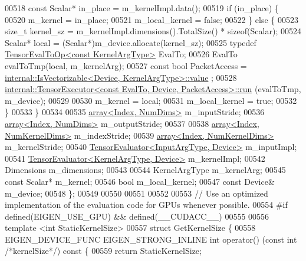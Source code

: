\begin{DoxyCode}
00518     \textcolor{keyword}{const} Scalar* in\_place = m\_kernelImpl.data();
00519     \textcolor{keywordflow}{if} (in\_place) \{
00520       m\_kernel = in\_place;
00521       m\_local\_kernel = \textcolor{keyword}{false};
00522     \} \textcolor{keywordflow}{else} \{
00523       \textcolor{keywordtype}{size\_t} kernel\_sz = m\_kernelImpl.dimensions().TotalSize() * \textcolor{keyword}{sizeof}(Scalar);
00524       Scalar* local = (Scalar*)m\_device.allocate(kernel\_sz);
00525       \textcolor{keyword}{typedef} \hyperlink{class_eigen_1_1_tensor_eval_to_op}{TensorEvalToOp<const KernelArgType>} EvalTo;
00526       EvalTo evalToTmp(local, m\_kernelArg);
00527       \textcolor{keyword}{const} \textcolor{keywordtype}{bool} PacketAccess = 
      \hyperlink{struct_eigen_1_1internal_1_1_is_vectorizable}{internal::IsVectorizable<Device, KernelArgType>::value}
      ;
00528       \hyperlink{class_eigen_1_1internal_1_1_tensor_executor}{internal::TensorExecutor<const EvalTo, Device, PacketAccess>::run}
      (evalToTmp, m\_device);
00529 
00530       m\_kernel = local;
00531       m\_local\_kernel = \textcolor{keyword}{true};
00532     \}
00533   \}
00534 
00535   \hyperlink{class_eigen_1_1array}{array<Index, NumDims>} m\_inputStride;
00536   \hyperlink{class_eigen_1_1array}{array<Index, NumDims>} m\_outputStride;
00537 
00538   \hyperlink{class_eigen_1_1array}{array<Index, NumKernelDims>} m\_indexStride;
00539   \hyperlink{class_eigen_1_1array}{array<Index, NumKernelDims>} m\_kernelStride;
00540   \hyperlink{struct_eigen_1_1_tensor_evaluator}{TensorEvaluator<InputArgType, Device>} m\_inputImpl;
00541   \hyperlink{struct_eigen_1_1_tensor_evaluator}{TensorEvaluator<KernelArgType, Device>} m\_kernelImpl;
00542   Dimensions m\_dimensions;
00543 
00544   KernelArgType m\_kernelArg;
00545   \textcolor{keyword}{const} Scalar* m\_kernel;
00546   \textcolor{keywordtype}{bool} m\_local\_kernel;
00547   \textcolor{keyword}{const} Device& m\_device;
00548 \};
00549 
00550 
00551 
00552 
00553 \textcolor{comment}{// Use an optimized implementation of the evaluation code for GPUs whenever possible.}
00554 \textcolor{preprocessor}{#if defined(EIGEN\_USE\_GPU) && defined(\_\_CUDACC\_\_)}
00555 
00556 \textcolor{keyword}{template} <\textcolor{keywordtype}{int} StaticKernelSize>
00557 \textcolor{keyword}{struct }GetKernelSize \{
00558   EIGEN\_DEVICE\_FUNC EIGEN\_STRONG\_INLINE \textcolor{keywordtype}{int} operator() (\textcolor{keyword}{const} \textcolor{keywordtype}{int} \textcolor{comment}{/*kernelSize*/})\textcolor{keyword}{ const }\{
00559     \textcolor{keywordflow}{return} StaticKernelSize;

\end{DoxyCode}
